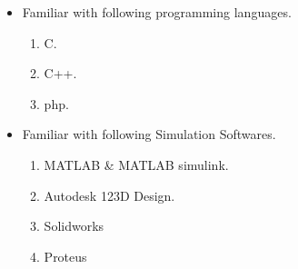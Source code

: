 \documentclass[11pt]{article}
\begin{document}
\begin{itemize}
\vspace{-0.60in}	                                     		\addtolength{\itemindent}{1in}	                                     \item  Familiar with following programming languages.
{\begin{enumerate}
\addtolength{\itemindent}{1.359in}                             		\item C.
\item C++.
\item php.
\end{enumerate}
}
\item  Familiar with following Simulation Softwares.
{\begin{enumerate}
\addtolength{\itemindent}{1.359in}                             		\item MATLAB \& MATLAB simulink.
\item Autodesk 123D Design.
\item Solidworks 
\item Proteus
\end{enumerate}
}
\end{itemize}
	                                     		
\end{document}
